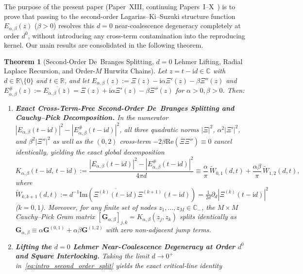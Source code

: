 \documentclass[11pt,reqno]{amsart}
\newtheorem{theorem}{Theorem}[section]
\theoremstyle{definition}
\theoremstyle{remark}
\numberwithin{equation}{section}
\newcommand{\R}{\mathbb{R}}
\newcommand{\C}{\mathbb{C}}
\newcommand{\ii}{\mathrm{i}}
\newcommand{\Rea}{\mathrm{Re}}
\newcommand{\Ima}{\mathrm{Im}}
\begin{document}
The purpose of the present paper (Paper~XIII, continuing Papers~I--X~\cite{missiaen2026paper1,missiaen2026paper2,missiaen2026paper3,missiaen2026paper4,missiaen2026paper5,missiaen2026paper6,missiaen2026paper7,missiaen2026paper8,missiaen2026paper9,missiaen2026paper10}) is to prove that passing to the second-order Lagarias--Ki--Suzuki structure function $E_{\alpha,\beta}(z)$ ($\beta > 0$) resolves this $d = 0$ near-coalescence degeneracy completely at order $d^0$, without introducing any cross-term contamination into the reproducing kernel. Our main results are consolidated in the following theorem.

\begin{theorem}[Second-Order De~Branges Splitting, $d=0$ Lehmer Lifting, Radial Laplace Recursion, and Order-$M$ Hurwitz Chains]\label{thm:main}
Let $z = t - \ii d \in \C$ with $d \in \R \setminus \{0\}$ and $t \in \R$, and let $E_{\alpha,\beta}(z) := \Xi(z) - \ii\alpha\Xi'(z) - \beta\Xi''(z)$ and $E_{\alpha,\beta}^\#(z) := \overline{E_{\alpha,\beta}(\bar{z})} = \Xi(z) + \ii\alpha\Xi'(z) - \beta\Xi''(z)$ for $\alpha > 0, \beta > 0$. Then:
\begin{enumerate}[label=\textup{(\roman*)},leftmargin=2.2em]
\item \textbf{Exact Cross-Term-Free Second-Order De~Branges Splitting and Cauchy--Pick Decomposition.} In the numerator $|E_{\alpha,\beta}(t-\ii d)|^2 - |E_{\alpha,\beta}^\#(t-\ii d)|^2$, all three quadratic norms $|\Xi|^2$, $\alpha^2|\Xi'|^2$, and $\beta^2|\Xi''|^2$ as well as the $(0,2)$ cross-term $-2\beta\Rea(\overline{\Xi}\Xi'') \equiv 0$ cancel identically, yielding the exact global decomposition
\begin{equation}\label{eq:intro_second_order_split}
K_{\alpha,\beta}(t - \ii d,\, t - \ii d) := \frac{|E_{\alpha,\beta}(t - \ii d)|^2 - |E_{\alpha,\beta}^\#(t - \ii d)|^2}{4\pi d} \equiv \frac{\alpha}{\pi}\,\widetilde{W}_{0,1}(d,t) + \frac{\alpha\beta}{\pi}\,\widetilde{W}_{1,2}(d,t),
\end{equation}
where $\widetilde{W}_{k,k+1}(d,t) := d^{-1}\Ima(\overline{\Xi^{(k)}(t-\ii d)}\Xi^{(k+1)}(t-\ii d)) = \frac{1}{2d}\partial_d|\Xi^{(k)}(t-\ii d)|^2$ ($k = 0, 1$). Moreover, for any finite set of nodes $z_1, \dots, z_M \in \C_-$, the $M \times M$ Cauchy--Pick Gram matrix $[\mathbf{G}_{\alpha,\beta}]_{j,k} = K_{\alpha,\beta}(z_j, z_k)$ splits identically as $\mathbf{G}_{\alpha,\beta} \equiv \alpha\mathbf{G}^{(0,1)} + \alpha\beta\mathbf{G}^{(1,2)}$ with zero non-adjacent jump terms.
\item \textbf{Lifting the $d=0$ Lehmer Near-Coalescence Degeneracy at Order $d^0$ and Square Interlocking.} Taking the limit $d \to 0^+$ in~\eqref{eq:intro_second_order_split} yields the exact critical-line identity

\end{enumerate}
\end{theorem}
\end{document}
